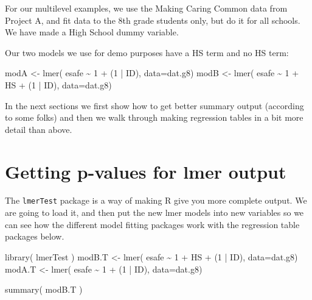 \documentclass[
  letterpaper,
  DIV=11,
  numbers=noendperiod]{scrreprt}
\newenvironment{Shaded}{\begin{snugshade}}{\end{snugshade}}
\newcommand{\AttributeTok}[1]{\textcolor[rgb]{0.49,0.56,0.16}{#1}}
\newcommand{\DecValTok}[1]{\textcolor[rgb]{0.25,0.63,0.44}{#1}}
\newcommand{\FunctionTok}[1]{\textcolor[rgb]{0.02,0.16,0.49}{#1}}
\newcommand{\NormalTok}[1]{\textcolor[rgb]{0.00,0.44,0.13}{#1}}
\newcommand{\OtherTok}[1]{\textcolor[rgb]{0.00,0.44,0.13}{#1}}
\newcommand{\SpecialCharTok}[1]{\textcolor[rgb]{0.25,0.44,0.63}{#1}}
\begin{document}
For our multilevel examples, we use the Making Caring Common data from
Project A, and fit data to the 8th grade students only, but do it for
all schools. We have made a High School dummy variable.

Our two models we use for demo purposes have a HS term and no HS term:

\begin{Shaded}
\begin{Highlighting}[]
\NormalTok{modA }\OtherTok{\textless{}{-}} \FunctionTok{lmer}\NormalTok{( esafe }\SpecialCharTok{\textasciitilde{}} \DecValTok{1} \SpecialCharTok{+}\NormalTok{ (}\DecValTok{1} \SpecialCharTok{|}\NormalTok{ ID), }\AttributeTok{data=}\NormalTok{dat.g8)}
\NormalTok{modB }\OtherTok{\textless{}{-}} \FunctionTok{lmer}\NormalTok{( esafe }\SpecialCharTok{\textasciitilde{}} \DecValTok{1} \SpecialCharTok{+}\NormalTok{ HS }\SpecialCharTok{+}\NormalTok{ (}\DecValTok{1} \SpecialCharTok{|}\NormalTok{ ID), }\AttributeTok{data=}\NormalTok{dat.g8)}
\end{Highlighting}
\end{Shaded}

In the next sections we first show how to get better summary output
(according to some folks) and then we walk through making regression
tables in a bit more detail than above.

\hypertarget{getting-p-values-for-lmer-output}{%
\section{Getting p-values for lmer
output}\label{getting-p-values-for-lmer-output}}

The \texttt{lmerTest} package is a way of making R give you more
complete output. We are going to load it, and then put the new lmer
models into new variables so we can see how the different model fitting
packages work with the regression table packages below.

\begin{Shaded}
\begin{Highlighting}[]
\FunctionTok{library}\NormalTok{( lmerTest )}
\NormalTok{modB.T }\OtherTok{\textless{}{-}} \FunctionTok{lmer}\NormalTok{( esafe }\SpecialCharTok{\textasciitilde{}} \DecValTok{1} \SpecialCharTok{+}\NormalTok{ HS }\SpecialCharTok{+}\NormalTok{ (}\DecValTok{1} \SpecialCharTok{|}\NormalTok{ ID), }\AttributeTok{data=}\NormalTok{dat.g8)}
\NormalTok{modA.T }\OtherTok{\textless{}{-}} \FunctionTok{lmer}\NormalTok{( esafe }\SpecialCharTok{\textasciitilde{}} \DecValTok{1} \SpecialCharTok{+}\NormalTok{ (}\DecValTok{1} \SpecialCharTok{|}\NormalTok{ ID), }\AttributeTok{data=}\NormalTok{dat.g8)}

\FunctionTok{summary}\NormalTok{( modB.T )}
\end{Highlighting}
\end{Shaded}
\end{document}
